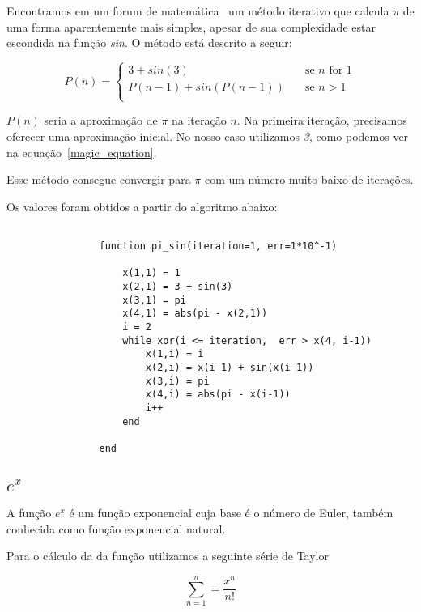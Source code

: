 			Encontramos em um forum de matemática~\cite{mathForum} um método
			iterativo que calcula $\pi$ de uma forma aparentemente mais simples,
			apesar de sua complexidade estar escondida na função \emph{sin}. O
			método está descrito a seguir:

			\begin{equation}
			\label{magic_equation}
				P(n) =
				\begin{cases}
					3 + sin (3) & \quad \text{se } n \text{\ for } 1\\
					P(n-1) + sin(P(n-1)) & \quad \text{se } n > 1\\
				\end{cases}
			\end{equation}

			$P(n)$ seria a aproximação de $\pi$ na iteração $n$. Na primeira
			iteração, precisamos oferecer uma aproximação inicial. No nosso caso
			utilizamos \emph{3}, como podemos ver na
			equação~\ref{magic_equation}.

			Esse método consegue convergir para $\pi$ com um número muito baixo
			de iterações.

			

			Os valores foram obtidos a partir do algoritmo abaixo:

			\begin{lstlisting}

				function pi_sin(iteration=1, err=1*10^-1)

					x(1,1) = 1
					x(2,1) = 3 + sin(3)
					x(3,1) = pi
					x(4,1) = abs(pi - x(2,1))
					i = 2
					while xor(i <= iteration,  err > x(4, i-1))
						x(1,i) = i
						x(2,i) = x(i-1) + sin(x(i-1))
						x(3,i) = pi
						x(4,i) = abs(pi - x(i-1))
						i++
					end

				end

			\end{lstlisting}

	\subsection{$e^x$}

		A função $e^x$ é um função exponencial cuja base é o número de Euler,
		também conhecida como função exponencial natural.

		Para o cálculo da da função utilizamos a seguinte série de Taylor

		\begin{equation}
			\sum_{n=1}^{n} = \frac{x^n}{n!}
		\end{equation}

